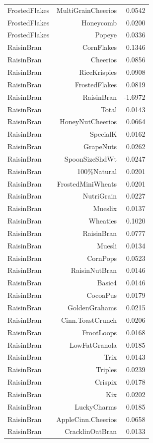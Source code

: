\begin{longtable}{@{}lrr@{}}
FrostedFlakes & MultiGrainCheerios & 0.0542 \\
FrostedFlakes & Honeycomb & 0.0200 \\
FrostedFlakes & Popeye & 0.0336 \\
RaisinBran & CornFlakes & 0.1346 \\
RaisinBran & Cheerios & 0.0856 \\
RaisinBran & RiceKrispies & 0.0908 \\
RaisinBran & FrostedFlakes & 0.0819 \\
RaisinBran & RaisinBran & -1.6972 \\
RaisinBran & Total & 0.0143 \\
RaisinBran & HoneyNutCheerios & 0.0664 \\
RaisinBran & SpecialK & 0.0162 \\
RaisinBran & GrapeNuts & 0.0262 \\
RaisinBran & SpoonSizeShdWt & 0.0247 \\
RaisinBran & 100\%Natural & 0.0201 \\
RaisinBran & FrostedMiniWheats & 0.0201 \\
RaisinBran & NutriGrain & 0.0227 \\
RaisinBran & Mueslix & 0.0137 \\
RaisinBran & Wheaties & 0.1020 \\
RaisinBran & RaisinBran & 0.0777 \\
RaisinBran & Muesli & 0.0134 \\
RaisinBran & CornPops & 0.0523 \\
RaisinBran & RaisinNutBran & 0.0146 \\
RaisinBran & Basic4 & 0.0146 \\
RaisinBran & CocoaPus & 0.0179 \\
RaisinBran & GoldenGrahams & 0.0215 \\
RaisinBran & Cinn.ToastCrunch & 0.0206 \\
RaisinBran & FrootLoops & 0.0168 \\
RaisinBran & LowFatGranola & 0.0185 \\
RaisinBran & Trix & 0.0143 \\
RaisinBran & Triples & 0.0239 \\
RaisinBran & Crispix & 0.0178 \\
RaisinBran & Kix & 0.0202 \\
RaisinBran & LuckyCharms & 0.0185 \\
RaisinBran & AppleCinn.Cheerios & 0.0658 \\
RaisinBran & CracklinOatBran & 0.0133 \\

\end{longtable}
